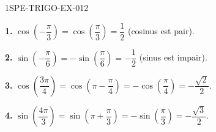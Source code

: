 \begin{corrige}{1SPE-TRIGO-EX-012}


\textbf{1.} $\cos\!\left(-\dfrac{\pi}{3}\right) = \cos\!\left(\dfrac{\pi}{3}\right) = \dfrac{1}{2}$ (cosinus est pair).

\textbf{2.} $\sin\!\left(-\dfrac{\pi}{6}\right) = -\sin\!\left(\dfrac{\pi}{6}\right) = -\dfrac{1}{2}$ (sinus est impair).

\textbf{3.} $\cos\!\left(\dfrac{3\pi}{4}\right) = \cos\!\left(\pi - \dfrac{\pi}{4}\right) = -\cos\!\left(\dfrac{\pi}{4}\right) = -\dfrac{\sqrt{2}}{2}$.

\textbf{4.} $\sin\!\left(\dfrac{4\pi}{3}\right) = \sin\!\left(\pi + \dfrac{\pi}{3}\right) = -\sin\!\left(\dfrac{\pi}{3}\right) = -\dfrac{\sqrt{3}}{2}$.

\end{corrige}
